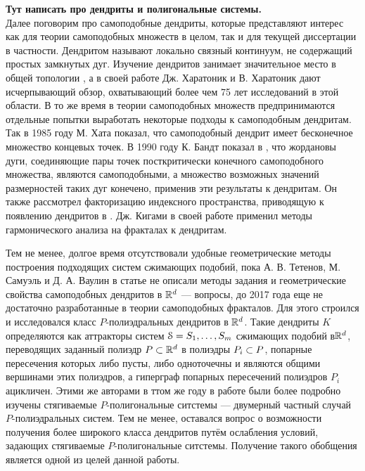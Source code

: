 {\bf Тут написать про дендриты и полигональные системы.}\\
Далее поговорим про самоподобные дендриты, которые представляют интерес как для теории самоподобных множеств в целом, так и для текущей диссертации в частности.
Дендритом называют локально связный континуум, не содержащий простых замкнутых дуг.
Изучение дендритов занимает значительное место в общей топологии \cite{Kur1, whyburn1948antop}, а в своей работе \cite{Char} Дж. Харатоник и В. Харатоник дают исчерпывающий обзор, охватывающий более чем 75 лет исследований в этой области.
В то же время в теории самоподобных множеств предпринимаются отдельные попытки выработать некоторые подходы к самоподобным дендритам.
Так в 1985 году М. Хата \cite{Hata1985}  показал, что самоподобный дендрит имеет бесконечное множество концевых точек.
В 1990 году К. Бандт показал в \cite{SSS6}, что жордановы дуги, соединяющие пары точек посткритически конечного самоподобного множества, являются самоподобными, а множество возможных значений размерностей таких дуг конечено, применив эти результаты к дендритам.
Он также рассмотрел факторизацию индексного пространства, приводящую к появлению дендритов в \cite{SSS2}.
Дж. Кигами в своей работе \cite{Kig95} применил методы гармонического анализа на фракталах к дендритам. 

Тем не менее, долгое время отсутствовали удобные геометрические методы построения подходящих систем сжимающих подобий, пока А. В. Тетенов, М. Самуэль и Д. А. Ваулин в статье \cite{TSV2017} не описали методы задания и геометрические свойства самоподобных дендритов в $\mathbb{R}^d$ --- вопросы, до 2017 года еще не достаточно разработанные в теории самоподобных фракталов. 
Для этого строился и исследовался класс $P$-полиэдральных дендритов в $\mathbb{R}^d$. 
Такие дендриты $K$ определяются как аттракторы систем ${\EuScript S} = {S_1,\ldots, S_m}$ сжимающих подобий в$\mathbb{R}^d$, переводящих заданный полиэдр $P \subset \mathbb{R}^d$ в полиэдры $P_i \subset P$, попарные пересечения которых либо пусты, либо одноточечны и являются общими вершинами этих полиэдров, а гиперграф попарных пересечений полиэдров $P_i$ ацикличен.
Этими же авторами в ттом же году в работе \cite{STV2017} были более подробно изучены стягиваемые $P$-полигональные ситстемы --- двумерный частный случай $P$-полиэдральных систем.
Тем не менее, оставался вопрос о возможности получения более широкого класса дендритов путём ослабления условий, задающих стягиваемые $P$-полигональные ситстемы. 
Получение такого обобщения является одной из целей данной работы.


